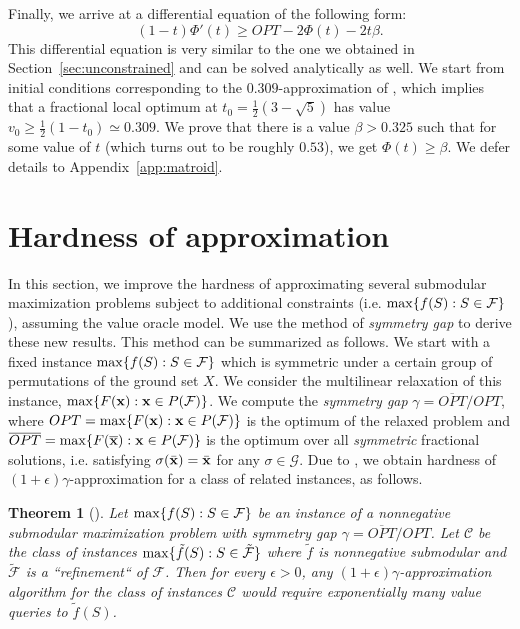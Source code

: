 \documentclass{article}[11pt]
\newtheorem{theorem}{Theorem}[section]
\def\bx{{\bf x}}
\def\cF{{\cal F}}
\def\cG{{\mathcal{G}}}
\def\eps {\epsilon}
\def\max{{\rm{max}}}
\begin{document}
Finally, we arrive at a differential equation of the following form:
$$ (1-t) \Phi'(t) \geq OPT - 2 \Phi(t) - 2t\beta.$$
This differential equation is very similar to the one we obtained in 
Section~\ref{sec:unconstrained} and can be solved analytically as well.
We start from initial conditions corresponding to the $0.309$-approximation
of \cite{Vondrak09}, which implies that 
a fractional local optimum at $t_0 = \frac12 (3-\sqrt{5})$ has value
$v_0 \geq \frac12 (1-t_0) \simeq 0.309$. We prove that there is a value
$\beta > 0.325$ such that
for some value of $t$ (which turns out to be roughly $0.53$),
we get $\Phi(t) \geq \beta$. We defer details to Appendix~\ref{app:matroid}.





\section{Hardness of approximation} 
\label{sec:hardness}

In this section, we improve the hardness of approximating several submodular maximization
problems subject to additional constraints (i.e. $\max\{f(S): S\in \mathcal{F}\}$),
assuming the value oracle model. We use the method of {\em symmetry gap}
\cite{Vondrak09} to derive these new results. 
This method can be summarized as follows.
We start with a fixed instance $\max \{f(S): S \in \cF\}$ which is symmetric
under a certain group of permutations of the ground set $X$. We consider
the multilinear relaxation of this instance, $\max \{F(\bx): \bx \in P(\cF)\}$.
We compute the {\em symmetry gap} $\gamma = \overline{OPT} / OPT$,
where $OPT = \max \{F(\bx): \bx \in P(\cF)\}$ is the optimum of the relaxed
problem and $\overline{OPT} = \max \{F(\overline{\bx}): \bx \in P(\cF) \}$ is the optimum
over all {\em symmetric} fractional solutions, i.e. satisfying $\sigma(\bar{\bx}) = \bar{\bx}$
for any $\sigma \in \cG$. Due to \cite[Theorem 1.6]{Vondrak09}, we obtain hardness
of $(1+\epsilon) \gamma$-approximation for a class of related instances, as follows.

\begin{theorem}[\cite{Vondrak09}]
\label{thm:symmetrygap}
Let $\max \{f(S): S\in \mathcal{F}\}$ be an instance of a nonnegative submodular
maximization problem with symmetry gap $\gamma=\overline{OPT}/OPT$.
Let $\mathcal{C}$ be the class of instances $\max \{\tilde{f}(S): S \in \tilde{\mathcal{F}}\}$
where $\tilde{f}$ is nonnegative submodular and $\tilde{\mathcal{F}}$ is a ``refinement``
of $\mathcal{F}$. Then for every $\eps>0$, any $(1+\epsilon)\gamma$-approximation algorithm
for the class of instances $\mathcal{C}$ would require exponentially many value queries
to $\tilde{f}(S)$. 
\end{theorem}
\end{document}
